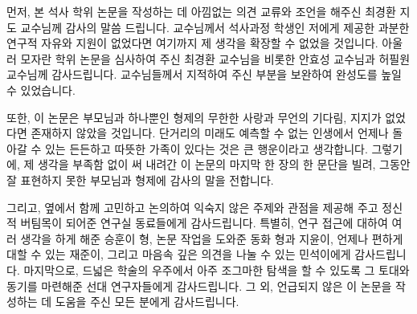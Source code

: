 
먼저, 본 석사 학위 논문을 작성하는 데 아낌없는 의견 교류와 조언을 해주신 최경환 지도 교수님께 감사의 말씀 드립니다.
교수님께서 석사과정 학생인 저에게 제공한 과분한 연구적 자유와 지원이 없었다면 여기까지 제 생각을 확장할 수 없었을 것입니다.
아울러 모자란 학위 논문을 심사하여 주신 최경환 교수님을 비롯한 안효성 교수님과 허필원 교수님께 감사드립니다.
교수님들께서 지적하여 주신 부분을 보완하여 완성도를 높일 수 있었습니다.

또한, 이 논문은 부모님과 하나뿐인 형제의 무한한 사랑과 무언의 기다림, 지지가 없었다면 존재하지 않았을 것입니다.
단거리의 미래도 예측할 수 없는 인생에서 언제나 돌아갈 수 있는 든든하고 따뜻한 가족이 있다는 것은 큰 행운이라고 생각합니다.
그렇기에, 제 생각을 부족함 없이 써 내려간 이 논문의 마지막 한 장의 한 문단을 빌려, 그동안 잘 표현하지 못한 부모님과 형제에 감사의 말을 전합니다.

그리고, 옆에서 함께 고민하고 논의하여 익숙지 않은 주제와 관점을 제공해 주고 정신적 버팀목이 되어준 연구실 동료들에게 감사드립니다.
특별히, 연구 접근에 대하여 여러 생각을 하게 해준 승훈이 형, 논문 작업을 도와준 동화 형과 지윤이, 언제나 편하게 대할 수 있는 재준이, 그리고 마음속 깊은 의견을 나눌 수 있는 민석이에게 감사드립니다.
마지막으로, 드넓은 학술의 우주에서 아주 조그마한 탐색을 할 수 있도록 그 토대와 동기를 마련해준 선대 연구자들에게 감사드립니다.
그 외, 언급되지 않은 이 논문을 작성하는 데 도움을 주신 모든 분에게 감사드립니다.